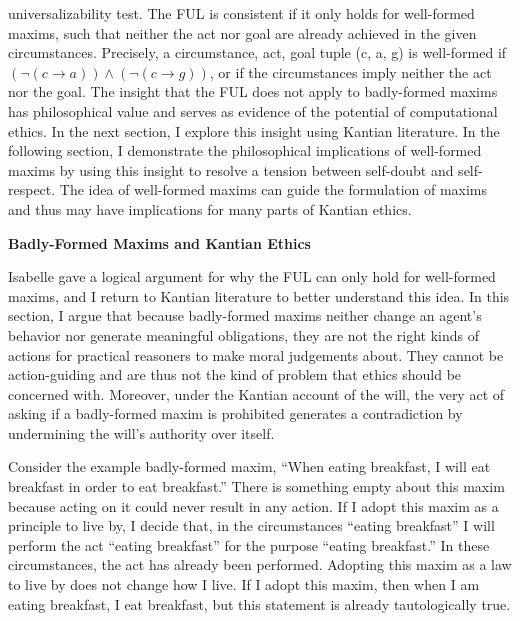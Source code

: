 \begin{isabellebody}
\begin{isamarkuptext}
universalizability test. The FUL is consistent if it only holds for well-formed maxims,
such that neither the act nor goal are already achieved in the given circumstances. Precisely, 
a circumstance, act, goal tuple (c, a, g) is well-formed if $(\neg (c \longrightarrow a) ) \wedge 
(\neg(c \longrightarrow g))$, or if the circumstances imply neither the act nor the goal. The insight
that the FUL does not apply to badly-formed maxims has philosophical value and serves as evidence 
of the potential of computational ethics. In the next section, I explore this insight using 
Kantian literature. In the following section, I demonstrate the philosophical implications of well-formed
maxims by using this insight to resolve a tension between self-doubt and self-respect. The idea of well-formed
maxims can guide the formulation of maxims and thus may have implications for many parts of Kantian ethics.

\noindent \textbf{Badly-Formed Maxims and Kantian Ethics}

Isabelle gave a logical argument for why the FUL can only hold for well-formed maxims, and I return to Kantian
literature to better understand this idea. In this section, I argue that 
because badly-formed maxims
neither change an agent's behavior nor generate meaningful obligations, they are not the right kinds of 
actions for practical reasoners to make moral judgements about. They cannot be action-guiding and are thus not the kind of problem that 
ethics should be concerned with. Moreover, under the Kantian account of the will, the very act of asking 
if a badly-formed maxim is prohibited generates a contradiction by undermining the will's authority over itself. 

Consider the example badly-formed maxim, ``When eating breakfast, I will eat breakfast in order to 
eat breakfast.'' There is something empty about this maxim because acting on it could never result in 
any action. If I adopt this maxim as a principle to live by,
I decide that, in the circumstances ``eating breakfast'' I will perform the act ``eating breakfast''
for the purpose ``eating breakfast.'' In these circumstances, the act has 
already been performed. Adopting this maxim as a law to live by does not change how I live. If I adopt 
this maxim, then when I am eating breakfast, I eat breakfast, but this statement is already tautologically true. 


\end{isamarkuptext}
\end{isabellebody}
